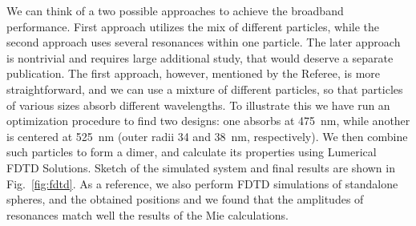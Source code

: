 \documentclass[a4paper]{article}
\begin{document}
We can think of a two possible approaches to achieve the broadband
performance. First approach utilizes the mix of different particles,
while the second approach uses several resonances within one
particle. The later approach is nontrivial and requires large
additional study, that would deserve a separate publication. The first
approach, however, mentioned by the Referee, is more straightforward,
and we can use a mixture of different particles, so that particles of various sizes absorb different wavelengths.  To illustrate this we have
run an optimization procedure to find two designs: one absorbs at
475~nm, while another is centered at 525~nm (outer radii 34 and 38~nm,
respectively). We then combine such particles to form a dimer, and
calculate its properties using Lumerical FDTD Solutions. Sketch of the
simulated system and final results are shown in
Fig.~\ref{fig:fdtd}. As a reference, we also perform FDTD simulations
of standalone spheres, and the obtained positions and we found that the amplitudes of
resonances match well the results of the Mie calculations.
\end{document}
